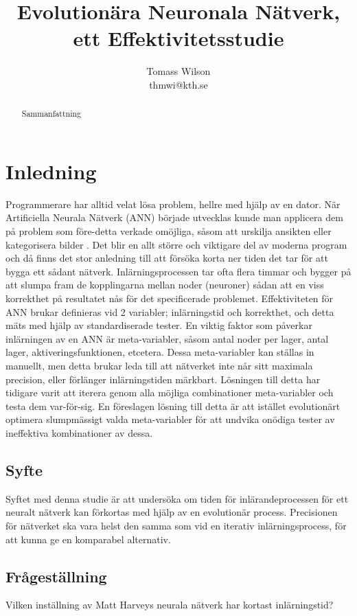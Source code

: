 \documentclass[a4paper, 11pt, twocolumn]{article}
\title{Evolutionära Neuronala Nätverk, ett Effektivitetsstudie}
\author{Tomass Wilson\\thmwi@kth.se}
\begin{document}
  \maketitle

  \begin{abstract}
    Sammanfattning
  \end{abstract}

  \tableofcontents

  \section{Inledning}
    Programmerare har alltid velat lösa problem, hellre med hjälp av en dator. När Artificiella Neurala Nätverk (ANN) började utvecklas kunde man applicera dem på problem som före-detta verkade omöjliga, såsom att urskilja ansikten eller kategorisera bilder \parencite{hopfield1988artificial}. Det blir en allt större och viktigare del av moderna program och då finns det stor anledning till att försöka korta ner tiden det tar för att bygga ett sådant nätverk. Inlärningsprocessen tar ofta flera timmar och bygger på att slumpa fram de kopplingarna mellan noder (neuroner) sådan att en viss korrekthet på resultatet nås för det specificerade problemet. Effektiviteten för ANN brukar definieras vid 2 variabler; inlärningstid och korrekthet, och detta mäts med hjälp av standardiserade tester. En viktig faktor som påverkar inlärningen av en ANN är meta-variabler, såsom antal noder per lager, antal lager, aktiveringsfunktionen, etcetera. Dessa meta-variabler kan ställas in manuellt, men detta brukar leda till att nätverket inte når sitt maximala precision, eller förlänger inlärningstiden märkbart. Lösningen till detta har tidigare varit att iterera genom alla möjliga combinationer meta-variabler och testa dem var-för-sig. En föreslagen lösning till detta är att istället evolutionärt optimera slumpmässigt valda meta-variabler för att undvika onödiga tester av ineffektiva kombinationer av dessa.

    \subsection{Syfte}
    Syftet med denna studie är att undersöka om tiden för inlärandeprocessen för ett neuralt nätverk kan förkortas med hjälp av en evolutionär process. Precisionen för nätverket ska vara helst den samma som vid en iterativ inlärningsprocess, för att kunna ge en komparabel alternativ.
    \subsection{Frågeställning}
    Vilken inställning av Matt Harveys neurala nätverk har kortast inlärningstid?
\end{document}

